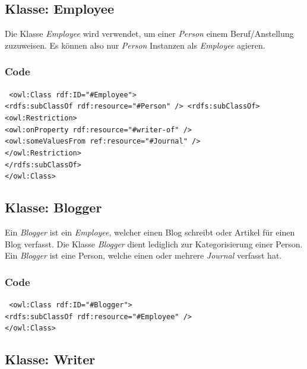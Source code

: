 ﻿\documentclass[
    11pt,
    latin1,
    a4paper,
    oneside
]{scrreprt}
\begin{document}
\subsection{Klasse: Employee} \label{sec:class_employee}

Die Klasse \emph{Employee} wird verwendet, um einer \emph{Person} einem Beruf/Anstellung zuzuweisen. Es können also nur \emph{Person} Instanzen als \emph{Employee} agieren.

\subsubsection{Code} \label{sec:class_employee_code}

\texttt{ <owl:Class rdf:ID="#Employee"> \\
	<rdfs:subClassOf rdf:resource="#Person" />
	<rdfs:subClassOf> \\
		<owl:Restriction> \\
			<owl:onProperty rdf:resource="#writer-of" /> \\
			<owl:someValuesFrom ref:resource="#Journal" /> \\
		</owl:Restriction> \\
	</rdfs:subClassOf> \\
</owl:Class> }


\subsection{Klasse: Blogger} \label{sec:class_blogger}

Ein \emph{Blogger} ist ein \emph{Employee}, welcher einen Blog schreibt oder Artikel f\"ur einen Blog verfasst. Die Klasse \emph{Blogger} dient lediglich zur Kategorisierung einer Person. Ein \emph{Blogger} ist eine Person, welche einen oder mehrere \emph{Journal} verfasst hat.

\subsubsection{Code} \label{sec:class_blogger_code}

\texttt{ <owl:Class rdf:ID="#Blogger"> \\
    <rdfs:subClassOf rdf:resource="#Employee" /> \\
</owl:Class> }


\subsection{Klasse: Writer} \label{sec:class_writer}
\end{document}
